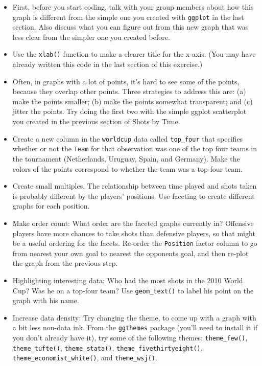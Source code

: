 \documentclass[]{book}
\providecommand{\tightlist}{%
  \setlength{\itemsep}{0pt}\setlength{\parskip}{0pt}}
\theoremstyle{definition}
\theoremstyle{definition}
\theoremstyle{definition}
\theoremstyle{remark}
\begin{document}
\begin{itemize}
\tightlist
\item
  First, before you start coding, talk with your group members about how
  this graph is different from the simple one you created with
  \texttt{ggplot} in the last section. Also discuss what you can figure
  out from this new graph that was less clear from the simpler one you
  created before.
\item
  Use the \texttt{xlab()} function to make a clearer title for the
  x-axis. (You may have already written this code in the last section of
  this exercise.)
\item
  Often, in graphs with a lot of points, it's hard to see some of the
  points, because they overlap other points. Three strategies to address
  this are: (a) make the points smaller; (b) make the points somewhat
  transparent; and (c) jitter the points. Try doing the first two with
  the simple ggplot scatterplot you created in the previous section of
  Shots by Time.
\item
  Create a new column in the \texttt{worldcup} data called
  \texttt{top\_four} that specifies whether or not the \texttt{Team} for
  that observation was one of the top four teams in the tournament
  (Netherlands, Uruguay, Spain, and Germany). Make the colors of the
  points correspond to whether the team was a top-four team.
\item
  Create small multiples. The relationship between time played and shots
  taken is probably different by the players' positions. Use faceting to
  create different graphs for each position.
\item
  Make order count: What order are the faceted graphs currently in?
  Offensive players have more chances to take shots than defensive
  players, so that might be a useful ordering for the facets. Re-order
  the \texttt{Position} factor column to go from nearest your own goal
  to nearest the opponents goal, and then re-plot the graph from the
  previous step.
\item
  Highlighting interesting data: Who had the most shots in the 2010
  World Cup? Was he on a top-four team? Use \texttt{geom\_text()} to
  label his point on the graph with his name.
\item
  Increase data density: Try changing the theme, to come up with a graph
  with a bit less non-data ink. From the \texttt{ggthemes} package
  (you'll need to install it if you don't already have it), try some of
  the following themes: \texttt{theme\_few()}, \texttt{theme\_tufte()},
  \texttt{theme\_stata()}, \texttt{theme\_fivethirtyeight()},
  \texttt{theme\_economist\_white()}, and \texttt{theme\_wsj()}.
\end{itemize}
\end{document}
